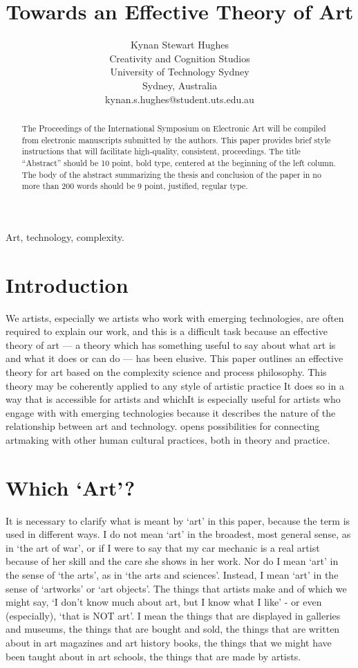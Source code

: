 \documentclass[letterpaper]{article}
\title{Towards an Effective Theory of Art}
\author{Kynan Stewart Hughes\\
Creativity and Cognition Studios\\
University of Technology Sydney\\
Sydney, Australia\\
kynan.s.hughes@student.uts.edu.au\\
\newline
\newline
}
\begin{document}
 
\maketitle
\begin{abstract}
The Proceedings of the International Symposium on Electronic
Art will be compiled from electronic manuscripts submitted by
the authors. This paper provides brief style instructions that will
facilitate high-quality, consistent, proceedings. The title
``Abstract'' should be 10 point, bold type, centered at the
beginning of the left column. The body of the abstract
summarizing the thesis and conclusion of the paper in no more
than 200 words should be 9 point, justified, regular type.
\end{abstract}


Art, technology, complexity.

\section{Introduction}

We artists, especially we artists who work with emerging technologies, are often required to explain our work, and this is a difficult task because an effective theory of art — a theory which has something useful to say about what art is and what it does or can do — has been elusive. This paper outlines an effective theory for art based on the complexity science and process philosophy. This theory may be coherently applied to any style of artistic practice It does so in a way that is accessible for artists and whichIt is especially useful for artists who engage with with emerging technologies because it describes the nature of the relationship between art and technology.  opens possibilities for connecting artmaking with other human cultural practices, both in theory and practice.

\section{Which ‘Art’?}

It is necessary to clarify what is meant by ‘art’ in this paper, because the term is used in different ways. I do not mean ‘art’ in the broadest, most general sense, as in ‘the art of war’, or if I were to say that my car mechanic is a real artist because of her skill and the care she shows in her work. Nor do I mean ‘art’ in the sense of ‘the arts’, as in ‘the arts and sciences’. Instead, I mean ‘art’ in the sense of ‘artworks’ or ‘art objects’. The things that artists make and of which we might say, ‘I don't know much about art, but I know what I like’ - or even (especially), ‘that is NOT art’. I mean the things that are displayed in galleries and museums, the things that are bought and sold, the things that are written about in art magazines and art history books, the things that we might have been taught about in art schools, the things that are made by artists.
\end{document}
